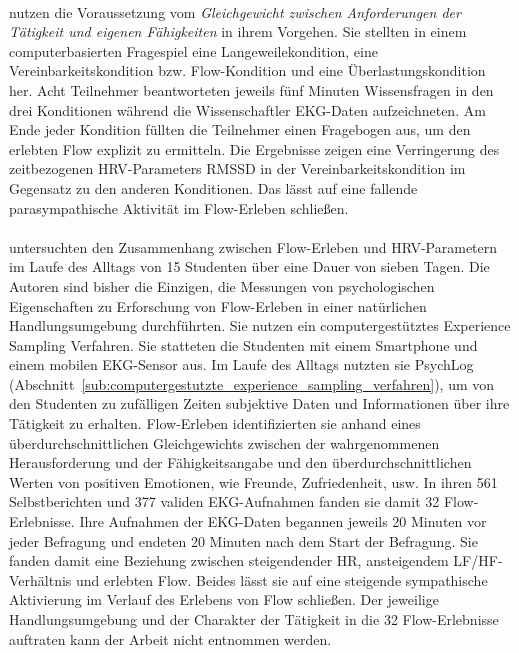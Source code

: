 \paragraph{\citet{Keller2011}} 

\label{par:keller2011}

nutzen die Voraussetzung vom \emph{Gleichgewicht zwischen Anforderungen der Tätigkeit und eigenen Fähigkeiten} in ihrem Vorgehen. Sie stellten in einem computerbasierten Fragespiel eine Langeweilekondition, eine Vereinbarkeitskondition bzw. Flow-Kondition und eine Überlastungskondition her. Acht Teilnehmer beantworteten jeweils fünf Minuten Wissensfragen in den drei Konditionen während die Wissenschaftler \ac{EKG}-Daten aufzeichneten. Am Ende jeder Kondition füllten die Teilnehmer einen Fragebogen \citep{Keller2008} aus, um den erlebten Flow explizit zu ermitteln. Die Ergebnisse zeigen eine Verringerung des zeitbezogenen \ac{HRV}-Parameters \acs{RMSSD} in der Vereinbarkeitskondition im Gegensatz zu den anderen Konditionen. Das lässt auf eine fallende parasympathische Aktivität im Flow-Erleben schließen.

\paragraph{\citet{Gaggioli2013}} 

\label{par:gaggioli2013}

untersuchten den Zusammenhang zwischen Flow-Erleben und \ac{HRV}-Parametern im Laufe des Alltags von 15 Studenten über eine Dauer von sieben Tagen. Die Autoren sind bisher die Einzigen, die Messungen von psychologischen Eigenschaften zu Erforschung von Flow-Erleben in einer natürlichen Handlungsumgebung durchführten. Sie nutzen ein computergestütztes Experience Sampling Verfahren. Sie statteten die Studenten mit einem Smartphone und einem mobilen \ac{EKG}-Sensor aus. Im Laufe des Alltags nutzten sie PsychLog (Abschnitt~\ref{sub:computergestutzte_experience_sampling_verfahren}), um von den Studenten zu zufälligen Zeiten subjektive Daten und Informationen über ihre Tätigkeit zu erhalten. Flow-Erleben identifizierten sie anhand eines überdurchschnittlichen Gleichgewichts zwischen der wahrgenommenen Herausforderung und der Fähigkeitsangabe und den überdurchschnittlichen Werten von positiven Emotionen, wie Freunde, Zufriedenheit, usw. In ihren 561 Selbstberichten und 377 validen \ac{EKG}-Aufnahmen fanden sie damit 32 Flow-Erlebnisse. Ihre Aufnahmen der \ac{EKG}-Daten begannen jeweils 20 Minuten vor jeder Befragung und endeten 20 Minuten nach dem Start der Befragung. Sie fanden damit eine Beziehung zwischen steigendender HR, ansteigendem \acs{LF}/\acs{HF}-Verhältnis und erlebten Flow. Beides lässt sie auf eine steigende sympathische Aktivierung im Verlauf des Erlebens von Flow schließen. Der jeweilige Handlungsumgebung und der Charakter der Tätigkeit in die 32 Flow-Erlebnisse auftraten kann der Arbeit nicht entnommen werden. 

